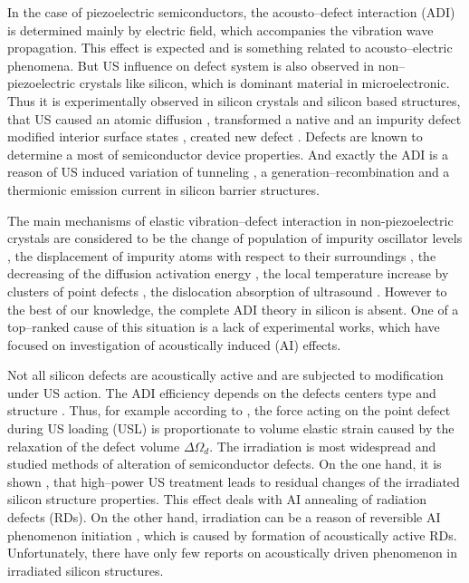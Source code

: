 \documentclass[aip,jap, amsmath,amssymb,reprint]{revtex4-1}
\begin{document}
In the case of piezoelectric semiconductors, the acousto--defect interaction (ADI) is determined mainly by electric field, which accompanies the vibration wave propagation.
This effect is expected and is something related to acousto--electric phenomena.
But US influence on defect system is also observed in non--piezoelectric crystals like silicon, which is dominant material in microelectronic.
Thus it is experimentally observed in silicon crystals and silicon based structures, that US
caused an atomic diffusion \cite{Roman:2010JAP,Roman:2007APL},
transformed a native and an impurity defect \cite{Ostapenko1994,Korotchenkov1995,Olikh2009Sem,Ostapenko1995,Ostrovskii2001}
modified  interior surface states \cite{UST:Medvid,Zaver:2008,Mirsagatov},
created new defect \cite{Savkina2015,Virot}.
Defects are known to determine a most of semiconductor device properties.
And exactly the ADI is a reason of US induced variation of tunneling \cite{Olikh2016JSem,Olikh2011Sem}, a generation--recombination \cite{Davletova2009,Davletova2008,YOlikh2005} and  a thermionic emission \cite{OlikhJAP,Olikh:Ultras} current in silicon barrier structures.

The main mechanisms of elastic vibration--defect interaction in non-piezoelectric crystals are considered to be
the  change  of  population  of  impurity  oscillator  levels  \cite{Pavlovich},
the displacement of impurity atoms with respect to their surroundings \cite{Korotchenkov1995,MirzadeJAP2011,PeleshchakUJF2016},
the decreasing of the diffusion activation  energy \cite{Krevchik},
the local temperature increase by clusters of point defects \cite{MirzadeJAP2005},
the dislocation absorption of ultrasound \cite{Davletova2008,OstrovKor92,Olikh:Ultras2016}.
However to the best of our knowledge, the complete ADI theory in silicon is absent.
One of a top--ranked cause of  this situation is a lack of experimental works, which have focused on investigation of acoustically induced (AI) effects.

Not all silicon defects are acoustically active and are subjected to modification under US action.
The ADI efficiency depends on the defects centers type and structure \cite{UST:Medvid}.
Thus, for example according to \cite{MirzadeJAP2011,PeleshchakUJF2016}, the force acting on the point defect during US loading (USL) is proportionate to volume elastic strain caused by the relaxation of the defect volume $\Delta\Omega_d$.
The irradiation is most widespread and studied methods of alteration of semiconductor defects.
On the one hand, it is shown \cite{YOlikh2007TPL,Parchinskii2006,Gorb2010,Podolian2012}, that high--power US treatment leads to residual changes of the irradiated silicon structure properties.
This effect deals with AI annealing of radiation defects (RDs).
On the other hand, irradiation can be a reason of reversible AI phenomenon initiation \cite{YOlikh2006TPL,YOlikhTPL2011}, which is caused by formation of acoustically active RDs.
Unfortunately, there have only few reports on acoustically driven phenomenon in irradiated silicon structures.
\end{document}
